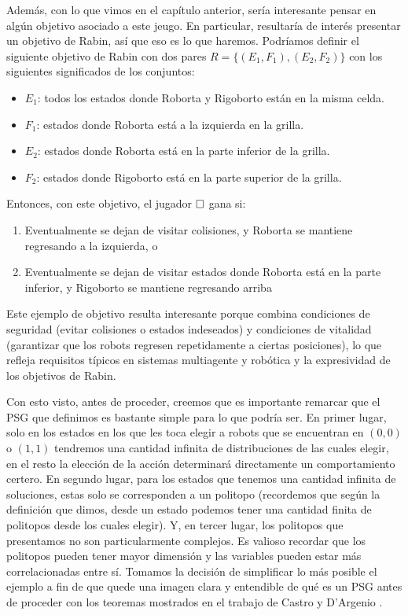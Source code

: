 Además, con lo que vimos en el capítulo anterior, sería interesante pensar en
algún objetivo asociado a este jeugo. En particular, resultaría de interés
presentar un objetivo de Rabin, así que eso es lo que haremos. Podríamos
definir el siguiente objetivo de Rabin con dos pares
$R=\{(E_1,F_1),(E_2,F_2)\}$ con los siguientes significados de los conjuntos:

\begin{itemize}
	\item $E_1$: todos los estados donde Roborta y Rigoborto están en la misma celda.
	\item $F_1$: estados donde Roborta está a la izquierda en la grilla.
	\item $E_2$: estados donde Roborta está en la parte inferior de la grilla.
	\item $F_2$: estados donde Rigoborto está en la parte superior de la grilla.
\end{itemize}

Entonces, con este objetivo, el jugador $\square$ gana si:
\begin{enumerate}
	\item Eventualmente se dejan de visitar colisiones, y Roborta se mantiene regresando
	      a la izquierda, o
	\item Eventualmente se dejan de visitar estados donde Roborta está en la parte
	      inferior, y Rigoborto se mantiene regresando arriba
\end{enumerate}

Este ejemplo de objetivo resulta interesante porque combina condiciones de
seguridad (evitar colisiones o estados indeseados) y condiciones de vitalidad
(garantizar que los robots regresen repetidamente a ciertas posiciones), lo que
refleja requisitos típicos en sistemas multiagente y robótica y la expresividad
de los objetivos de Rabin.

Con esto visto, antes de proceder, creemos que es importante remarcar que el
PSG que definimos es bastante simple para lo que podría ser. En primer lugar,
solo en los estados en los que les toca elegir a robots que se encuentran en
$(0,0)$ o $(1,1)$ tendremos una cantidad infinita de distribuciones de las
cuales elegir, en el resto la elección de la acción determinará directamente un
comportamiento certero. En segundo lugar, para los estados que tenemos una
cantidad infinita de soluciones, estas solo se corresponden a un politopo
(recordemos que según la definición que dimos, desde un estado podemos tener
una cantidad finita de politopos desde los cuales elegir). Y, en tercer lugar,
los politopos que presentamos no son particularmente complejos. Es valioso
recordar que los politopos pueden tener mayor dimensión y las variables pueden
estar más correlacionadas entre sí. Tomamos la decisión de simplificar lo más
posible el ejemplo a fin de que quede una imagen clara y entendible de qué es
un PSG antes de proceder con los teoremas mostrados en el trabajo de Castro y
D'Argenio \cite{Polytopal}.


